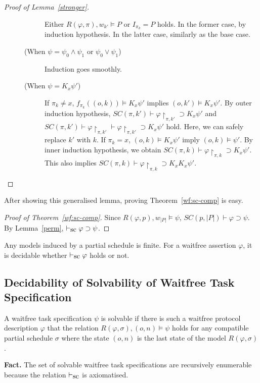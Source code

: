 \begin{proof}[Proof of Lemma~\ref{stronger}]
\begin{description}
\begin{description}
 Either $R(\varphi, \pi), w_{k'}\models P$ or $I_{\pi_k}=P$ holds.
 In the former case, by induction hypothesis.
 In the latter case, similarly as the base case.
 \item[(When $\psi = \psi_0\wedge \psi_1$ or $\psi_0\vee\psi_1$)] 
 Induction goes smoothly.
 \item[(When $\psi = K_x\psi'$)] 
If $\pi_k\neq x$, $f_{\pi_k}((o,k))\models K_x\psi'$ implies $(o,k')\models K_x\psi'$.
	    By outer induction hypothesis, $SC(\pi,k')\vdash
	    \varphi\restriction_{\pi,k'}\supset K_x\psi'$ and
	    $SC(\pi,k')\vdash \varphi\restriction_{\pi,k'}\vdash
	    \varphi\restriction_{\pi,k'}\supset K_x\psi'$ hold.
	    Here, we can safely replace $k'$ with $k$.
	    If $\pi_k=x$, $(o,k)\models K_x\psi'$ imply
	    $(o,k)\models \psi'$.
	    By inner induction hypothesis, we obtain
	    $SC(\pi,k)\vdash\varphi\restriction_{\pi,k}\supset K_x\psi'$.
	    This also implies $SC(\pi,k)\vdash\varphi\restriction_{\pi,k}\supset K_xK_x\psi'$.
\end{description}
\end{description}
\end{proof}
After showing this generalised lemma, proving Theorem~\ref{wf:sc-comp} is
easy.
\begin{proof}[Proof of Theorem~\ref{wf:sc-comp}]
 Since $R(\varphi, p), w_{|P|}\models \psi$, $SC(p,|P|)\vdash \varphi\supset
 \psi$.
By Lemma~\ref{perm}, $\vdash_{\mbox{\rm sc}}
 \varphi\supset \psi$.
\end{proof}
Any models induced by a partial schedule is finite.  For a waitfree assertion $\varphi$,
it is decidable whether $\vdash_{\mbox{\rm sc}} \varphi$ holds or not.


\subsection{Decidability of Solvability of Waitfree Task Specification}

\begin{definition}
 A waitfree task specification $\psi$ is solvable if there is such a
 waitfree protocol description $\varphi$ that the relation
 $R(\varphi,\sigma), (o,n)\models\psi$ holds for any compatible partial
 schedule $\sigma$ where the state $(o,n)$ is the last state of the
 model $R(\varphi,\sigma)$.
\end{definition}

\noindent \textbf{Fact.} The set of solvable waitfree task specifications are
recursively enumerable because the relation $\vdash_{\mbox{\rm sc}}$ is axiomatised.


